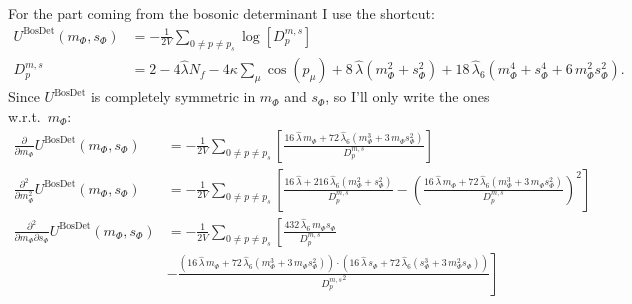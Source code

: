 For the part coming from the bosonic determinant I use the shortcut:
 \begin{align}\label{eq:CEP_bosonicDeterminantContribution_shortcut}
  U^{\text{BosDet}}(m_{\Phi},s_{\Phi}) &= - \frac{1}{2V}\sum\limits_{0 \neq p \neq p_s} \log \left[ D_p^{m,s} \right]
       \nonumber \\
   D_p^{m,s}                                 &=  2 - 4 \hat\lambda N_f - 4 \kappa \sum_{\mu} \cos(p_{\mu}) + 8\, \hat \lambda \left(m_{\Phi}^2 + s_{\Phi}^2 \right) 
                                        + 18\, \hat\lambda_6\left( m_{\Phi}^4 + s_{\Phi}^4 + 6\,  m_{\Phi}^2 s_{\Phi}^2 \right).
 \end{align}
Since $U^{\text{BosDet}}$ is completely symmetric in $m_{\Phi}$ and $s_{\Phi}$, so I'll only write the ones w.r.t.\ $m_{\Phi}$:
\begin{align}\label{eq:CEP_derivative_dm_bosonicContribution}
 \frac{\partial }{\partial m_{\Phi}} U^{\text{BosDet}}(m_{\Phi}, s_{\Phi}) &= - \frac{1}{2V}\sum\limits_{0 \neq p \neq p_s} 
                   \left[  \frac{16\, \hat\lambda\,  m_{\Phi}  + 72\,\hat\lambda_6 \left( m_{\Phi}^3 + 3\, m_{\Phi} s_{\Phi}^2 \right) }
                   { D_p^{m,s} }  \right]
       \\ \label{eq:CEP_derivative_dmdm_bosonicContribution}
%        
 \frac{\partial^2 }{\partial m_{\Phi}^2} U^{\text{BosDet}}(m_{\Phi}, s_{\Phi}) &= - \frac{1}{2V}\sum\limits_{0 \neq p \neq p_s} 
                   \left[  \frac{16\, \hat\lambda + 216\,\hat\lambda_6\left( m_{\Phi}^2 + s_{\Phi}^2 \right) }{ D_p^{m,s} }
                   - \left( \frac{16\, \hat\lambda\, m_{\Phi}  + 72\,\hat\lambda_6 \left( m_{\Phi}^3 + 3\, m_{\Phi} s_{\Phi}^2 \right)}{D_p^{m,s} } \right)^2    \right]
              \\ \label{eq:CEP_derivative_dmds_bosonicContribution}
%               
 \frac{\partial^2 }{\partial m_{\Phi}\partial s_{\Phi}} U^{\text{BosDet}}(m_{\Phi}, s_{\Phi}) &= - \frac{1}{2V}\sum\limits_{0 \neq p \neq p_s} 
                   \left[ \frac{432\, \hat\lambda_6\, m_{\Phi} s_{\Phi} }{ D_p^{m,s} } \right.
        \nonumber \\
                   & - \left.\frac{\left(16\, \hat\lambda\,  m_{\Phi}  + 72\,\hat\lambda_6 \left( m_{\Phi}^3 + 3\, m_{\Phi} s_{\Phi}^2 \right) \right)
                    \cdot \left(16\, \hat\lambda\,  s_{\Phi}  + 72\,\hat\lambda_6 \left( s_{\Phi}^3 + 3\, m_{\Phi}^2 s_{\Phi} \right) \right) }
                    { {D_p^{m,s}}^2 }  \right]
\end{align}

